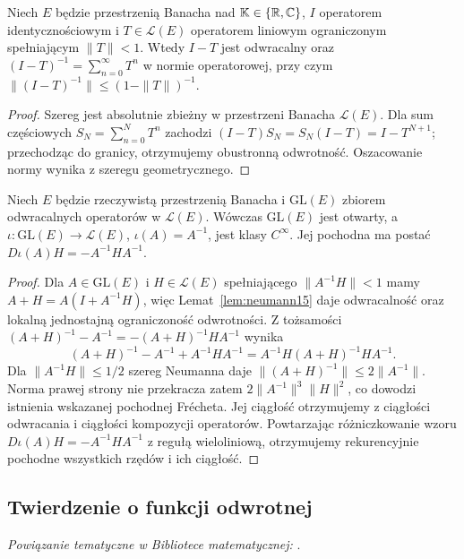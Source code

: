 \begin{lemat}
\label{lem:neumann15}
Niech $E$ będzie przestrzenią Banacha nad $\mathbb K\in\{\mathbb R,\mathbb C\}$, $I$ operatorem identycznościowym i $T\in\mathcal L(E)$ operatorem liniowym ograniczonym spełniającym $\|T\|<1$. Wtedy $I-T$ jest odwracalny oraz
$(I-T)^{-1}=\sum_{n=0}^\infty T^n$ w normie operatorowej, przy czym $\|(I-T)^{-1}\|\le(1-\|T\|)^{-1}$.
\end{lemat}
\begin{proof}
Szereg jest absolutnie zbieżny w przestrzeni Banacha $\mathcal L(E)$. Dla sum częściowych $S_N=\sum_{n=0}^N T^n$ zachodzi $(I-T)S_N=S_N(I-T)=I-T^{N+1}$; przechodząc do granicy, otrzymujemy obustronną odwrotność. Oszacowanie normy wynika z szeregu geometrycznego.
\end{proof}

\begin{stwierdzenie}
\label{prop:inverse-operator15}
Niech $E$ będzie rzeczywistą przestrzenią Banacha i $\mathrm{GL}(E)$ zbiorem odwracalnych operatorów w $\mathcal L(E)$. Wówczas $\mathrm{GL}(E)$ jest otwarty, a $\iota:\mathrm{GL}(E)\to\mathcal L(E)$, $\iota(A)=A^{-1}$, jest klasy $C^\infty$. Jej pochodna ma postać
$D\iota(A)H=-A^{-1}HA^{-1}$.
\end{stwierdzenie}
\begin{proof}
Dla $A\in\mathrm{GL}(E)$ i $H\in\mathcal L(E)$ spełniającego $\|A^{-1}H\|<1$ mamy $A+H=A(I+A^{-1}H)$, więc Lemat~\ref{lem:neumann15} daje odwracalność oraz lokalną jednostajną ograniczoność odwrotności. Z tożsamości
$(A+H)^{-1}-A^{-1}=-(A+H)^{-1}HA^{-1}$ wynika
\[
(A+H)^{-1}-A^{-1}+A^{-1}HA^{-1}
=A^{-1}H(A+H)^{-1}HA^{-1}.
\]
Dla $\|A^{-1}H\|\le1/2$ szereg Neumanna daje $\|(A+H)^{-1}\|\le2\|A^{-1}\|$. Norma prawej strony nie przekracza zatem $2\|A^{-1}\|^3\|H\|^2$, co dowodzi istnienia wskazanej pochodnej Frécheta. Jej ciągłość otrzymujemy z ciągłości odwracania i ciągłości kompozycji operatorów. Powtarzając różniczkowanie wzoru $D\iota(A)H=-A^{-1}HA^{-1}$ z regułą wieloliniową, otrzymujemy rekurencyjnie pochodne wszystkich rzędów i ich ciągłość.
\end{proof}

\subsection{Twierdzenie o funkcji odwrotnej}

\noindent\emph{Powiązanie tematyczne w Bibliotece matematycznej:} .


